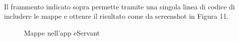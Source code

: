 \paragraph{}
Il frammento indicato sopra permette tramite una singola linea di codice
di includere le mappe e ottenre il risultato come da screenshot in Figura 11.
\begin{figure}[htp]
    \centering  
    \caption{Mappe nell'app eServant}

\end{figure}
